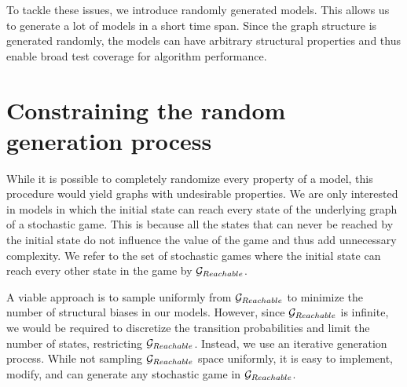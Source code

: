 To tackle these issues, we introduce randomly generated models. 
This allows us to generate a lot of models in a short time span.
Since the graph structure is generated randomly, 
the models can have arbitrary structural properties and thus enable broad test coverage for algorithm performance.



\section{Constraining the random generation process}
While it is possible to completely randomize every property of a model, this procedure would yield graphs with undesirable properties. 
We are only interested in models in which the initial state can reach every state of the underlying graph of a stochastic game. 
This is because all the states that can never be reached by the initial state do not influence the value of the game and thus add unnecessary complexity.
We refer to the set of stochastic games where the initial state can reach every other state in the game by $\mathcal{G}_{Reachable}$.

A viable approach is to sample uniformly from $\mathcal{G}_{Reachable}$ to minimize the number of structural biases in our models.
However, since $\mathcal{G}_{Reachable}$ is infinite, we would be required to discretize the transition probabilities and limit the number of states,
restricting $\mathcal{G}_{Reachable}$.
Instead, we use an iterative generation process.
While not sampling $\mathcal{G}_{Reachable}$ space uniformly, it is easy to implement, modify, and can generate any stochastic game in $\mathcal{G}_{Reachable}$.

